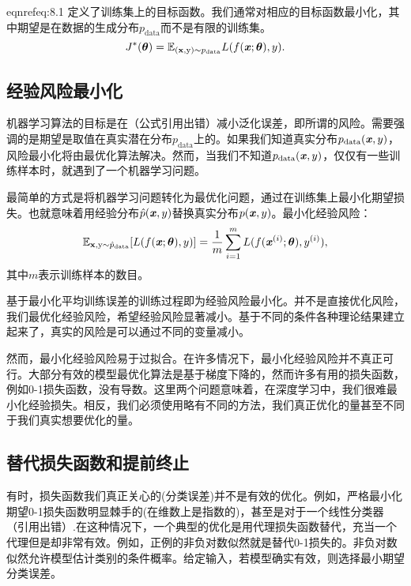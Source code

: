 eqnref{eq:8.1} 定义了训练集上的目标函数。我们通常对相应的目标函数最小化，其中期望是在数据的生成分布$p_{\text{data}}$而不是有限的训练集。
\begin{equation}
\label{eq:8.2}
    J^*(\boldsymbol{\theta}) = \mathbb{E}_{(\mathbf{x}, \mathrm{y}) \sim p_\text{data}} L(f(\boldsymbol{\mathit{x}} ;\boldsymbol{\theta}),y).
\end{equation}

\subsection{经验风险最小化}

机器学习算法的目标是在（公式引用出错）减小泛化误差，即所谓的风险。需要强调的是期望是取值在真实潜在分布$p_\text{data}$上的。如果我们知道真实分布$p_\text{data}(\boldsymbol{\mathit{x}}, y)$，风险最小化将由最优化算法解决。然而，当我们不知道$p_\text{data}(\boldsymbol{\mathit{x}}, y)$，仅仅有一些训练样本时，就遇到了一个机器学习问题。

最简单的方式是将机器学习问题转化为最优化问题，通过在训练集上最小化期望损失。也就意味着用经验分布$\hat{p}(\boldsymbol{\mathit{x}},y)$替换真实分布$p(\boldsymbol{\mathit{x}},y)$。最小化经验风险：
\begin{equation}
\label{eq:8.3}
    \mathbb{E}_{\mathbf{x}, \mathrm{y} \sim \hat{p}_\text{data}} [L(f(\boldsymbol{\mathit{x}} ; \boldsymbol{\theta}), y)]
    = \frac{1}{m} \sum_{i=1}^m L( f(\boldsymbol{\mathit{x}}^{(i)}; \boldsymbol{\theta}), y^{(i)}) ,
\end{equation}
其中$m$表示训练样本的数目。

基于最小化平均训练误差的训练过程即为经验风险最小化。并不是直接优化风险，我们最优化经验风险，希望经验风险显著减小。基于不同的条件各种理论结果建立起来了，真实的风险是可以通过不同的变量减小。

然而，最小化经验风险易于过拟合。在许多情况下，最小化经验风险并不真正可行。大部分有效的模型最优化算法是基于梯度下降的，然而许多有用的损失函数，例如0-1损失函数，没有导数。这里两个问题意味着，在深度学习中，我们很难最小化经验损失。相反，我们必须使用略有不同的方法，我们真正优化的量甚至不同于我们真实想要优化的量。

\subsection{替代损失函数和提前终止}

有时，损失函数我们真正关心的(分类误差)并不是有效的优化。例如，严格最小化期望0-1损失函数明显棘手的(在维数上是指数的)，甚至是对于一个线性分类器（引用出错）.在这种情况下，一个典型的优化是用代理损失函数替代，充当一个代理但是却非常有效。例如，正例的非负对数似然就是替代0-1损失的。非负对数似然允许模型估计类别的条件概率。给定输入，若模型确实有效，则选择最小期望分类误差。

